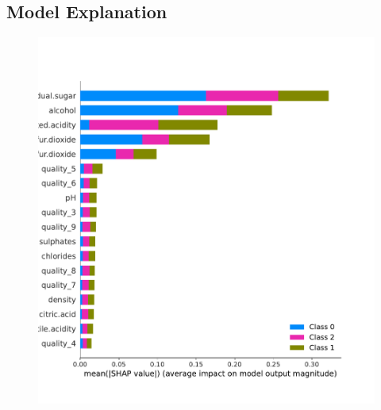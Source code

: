 \documentclass[11pt,twoside]{article}
\numberwithin{Theorem}{section}
\numberwithin{Definition}{section}
\numberwithin{Lemma}{section}
\numberwithin{Algorithm}{section}
\numberwithin{equation}{section}
\begin{document}
\subsection{Model Explanation}
\label{sec:explanation}
\blindtext

\vspace*{1em}
\begin{figure}[!h]
\centering
\includegraphics[width=\textwidth]{./output/2.i.shap-summary.pdf}
\caption{}
\label{fig:shap_sum}
\end{figure}
\vspace{2em}
\end{document}
